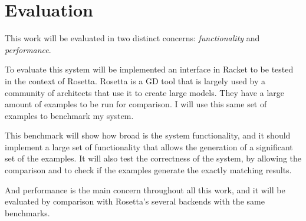 
% 
% 

\section{Evaluation}
\label{sec:evaluation}

This work will be evaluated in two distinct concerns: \emph{functionality} and \emph{performance}.

To evaluate this system will be implemented an interface in Racket to be tested in the context of Rosetta. Rosetta is a GD tool that is largely used by a community of architects that use it to create large models. They have a large amount of examples to be run for comparison. I will use this same set of examples to benchmark my system.

This benchmark will show how broad is the system functionality, and it should implement a large set of functionality that allows the generation of a significant set of the examples. It will also test the correctness of the system, by allowing the comparison and to check if the examples generate the exactly matching results.

And performance is the main concern throughout all this work, and it will be evaluated by comparison with Rosetta's several backends with the same benchmarks.


